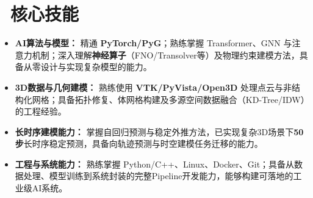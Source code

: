 \documentclass[11pt]{article}
\begin{document}
  
\section{\makebox[\widthof{\faCogs}][c]{\color{CVBlue}\faCogs}\ 核心技能}
\begin{itemize}
    \item \textbf{AI算法与模型：} 精通 \textbf{PyTorch/PyG}；熟练掌握 Transformer、GNN 与注意力机制；深入理解\textbf{神经算子}（FNO/Transolver等）及物理约束建模方法，具备从零设计与实现复杂模型的能力。
    \item \textbf{3D数据与几何建模：} 熟练使用 \textbf{VTK/PyVista/Open3D} 处理点云与非结构化网格；具备拓扑修复、体网格构建及多源空间数据融合（KD-Tree/IDW）的工程经验。
    \item \textbf{长时序建模能力：} 掌握自回归预测与稳定外推方法，已实现复杂3D场景下\textbf{50步}长时序稳定预测，具备向轨迹预测与时空建模任务迁移的能力。
    \item \textbf{工程与系统能力：} 熟练掌握 Python/C++、Linux、Docker、Git；具备从数据处理、模型训练到系统封装的完整Pipeline开发能力，能够构建可落地的工业级AI系统。
\end{itemize}
\end{document}
